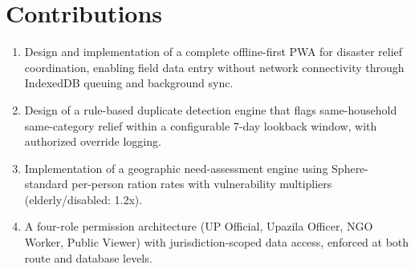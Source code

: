 \section{Contributions}

\begin{enumerate}[leftmargin=1.2cm]
    \item Design and implementation of a complete offline-first PWA for disaster relief coordination, enabling field data entry without network connectivity through IndexedDB queuing and background sync.
    \item Design of a rule-based duplicate detection engine that flags same-household same-category relief within a configurable 7-day lookback window, with authorized override logging.
    \item Implementation of a geographic need-assessment engine using Sphere-standard per-person ration rates with vulnerability multipliers (elderly/disabled: 1.2x).
    \item A four-role permission architecture (UP Official, Upazila Officer, NGO Worker, Public Viewer) with jurisdiction-scoped data access, enforced at both route and database levels.
\end{enumerate}
